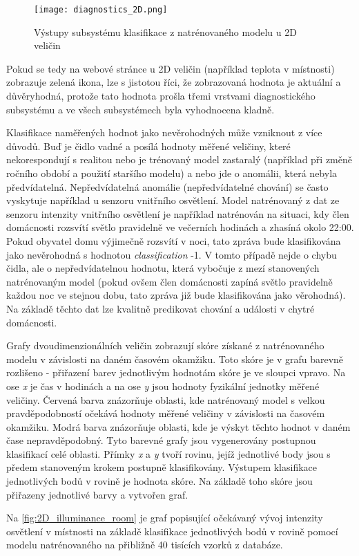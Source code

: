 \begin{figure}[H]
  \centering
  \texttt{[image: diagnostics\_2D.png]}
  \caption{Výstupy subsystému klasifikace z natrénovaného modelu u 2D veličin}
  \label{fig:diagnostics_2D}
\end{figure}  

Pokud se tedy na webové stránce u 2D veličin (například teplota v místnosti) zobrazuje zelená ikona, lze s jistotou říci, že zobrazovaná hodnota je aktuální a důvěryhodná, protože tato hodnota prošla třemi vrstvami diagnostického subsystému a ve všech subsystémech byla vyhodnocena kladně. \par
Klasifikace naměřených hodnot jako nevěrohodných může vzniknout z více důvodů. Buď je čidlo vadné a posílá hodnoty měřené veličiny, které nekorespondují s realitou nebo je trénovaný model zastaralý (například při změně ročního období a použití staršího modelu) a nebo jde o anomálii, která nebyla předvídatelná. Nepředvídatelná anomálie (nepředvídatelné chování) se často vyskytuje například u senzoru vnitřního osvětlení. Model natrénovaný z dat ze senzoru intenzity vnitřního osvětlení je například natrénován na situaci, kdy člen domácnosti rozsvítí světlo pravidelně ve večerních hodinách a zhasíná okolo 22:00. Pokud obyvatel domu výjimečně rozsvítí v noci, tato zpráva bude klasifikována jako nevěrohodná s hodnotou \textit{classification} -1. V tomto případě nejde o chybu čidla, ale o nepředvídatelnou hodnotu, která vybočuje z mezí stanovených natrénovaným model (pokud ovšem člen domácnosti zapíná světlo pravidelně každou noc ve stejnou dobu, tato zpráva již bude klasifikována jako věrohodná). Na základě těchto dat lze kvalitně predikovat chování a události v chytré domácnosti. \par
Grafy dvoudimenzionálních veličin zobrazují skóre získané z natrénovaného modelu v závislosti na daném časovém okamžiku. Toto skóre je v grafu barevně rozlišeno - přiřazení barev jednotlivým hodnotám skóre je ve sloupci vpravo. Na ose \textit{x} je čas v hodinách a na ose \textit{y} jsou hodnoty fyzikální jednotky měřené veličiny. Červená barva znázorňuje oblasti, kde natrénovaný model s velkou pravděpodobností očekává hodnoty měřené veličiny v závislosti na časovém okamžiku. Modrá barva znázorňuje oblasti, kde je výskyt těchto hodnot v daném čase nepravděpodobný. Tyto barevné grafy jsou vygenerovány postupnou klasifikací celé oblasti. Přímky \textit{x} a \textit{y} tvoří rovinu, jejíž jednotlivé body jsou s předem stanoveným krokem postupně klasifikovány. Výstupem klasifikace jednotlivých bodů v rovině je hodnota skóre. Na základě toho skóre jsou přiřazeny jednotlivé barvy a vytvořen graf. \par
Na \cref{fig:2D_illuminance_room} je graf popisující očekávaný vývoj intenzity osvětlení v místnosti na základě klasifikace jednotlivých bodů v rovině pomocí modelu natrénovaného na přibližně 40 tisících vzorků z databáze.

